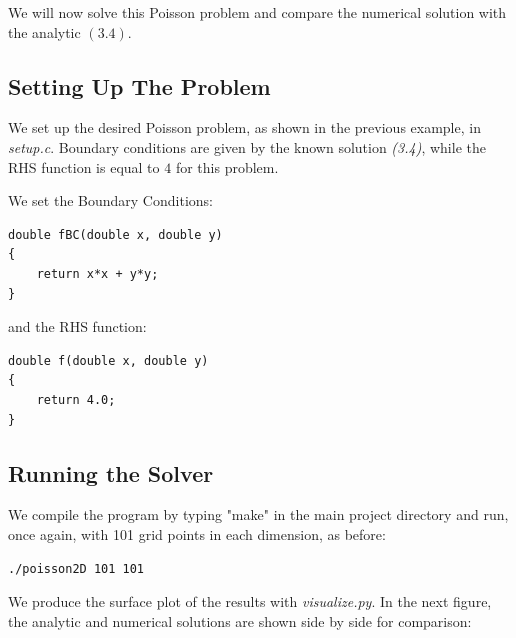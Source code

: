 \documentclass[11pt]{report}
\begin{document}
We will now solve this Poisson problem and compare the numerical solution with the analytic $(3.4)$.

\subsection{Setting Up The Problem}
We set up the desired Poisson problem, as shown in the previous example, in \emph{setup.c}. Boundary conditions are given by the known solution \emph{(3.4)}, while the RHS function is equal to $4$ for this problem. 
\newline

We set the Boundary Conditions:

\begin{lstlisting}
double fBC(double x, double y) 
{
    return x*x + y*y;
}
\end{lstlisting}

and the RHS function:

\begin{lstlisting}
double f(double x, double y) 
{
    return 4.0;
}
\end{lstlisting}

\subsection{Running the Solver}
We compile the program by typing "make" in the main project directory and run, once again, with 101 grid points in each dimension, as before:
\newline 

\begin{lstlisting}
./poisson2D 101 101
\end{lstlisting}

We produce the surface plot of the results with \emph{visualize.py}. In the next figure, the analytic and numerical solutions are shown side by side for comparison:
\end{document}
